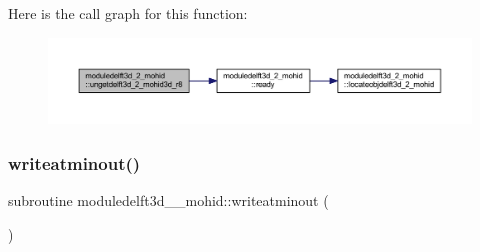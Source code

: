 Here is the call graph for this function\+:\nopagebreak
\begin{figure}[H]
\begin{center}
\leavevmode
\includegraphics[width=350pt]{namespacemoduledelft3d__2__mohid_a54e3fcc0277aae3ad660ec439e7e4a3c_cgraph}
\end{center}
\end{figure}
\mbox{\label{namespacemoduledelft3d__2__mohid_aaf8ed07f19208b8787807cb35199dca4}} 
\subsubsection{\texorpdfstring{writeatminout()}{writeatminout()}}
{\footnotesize\ttfamily subroutine moduledelft3d\+\_\+\_\+mohid\+::writeatminout (\begin{DoxyParamCaption}{ }\end{DoxyParamCaption})\hspace{0.3cm}{\ttfamily [private]}}

